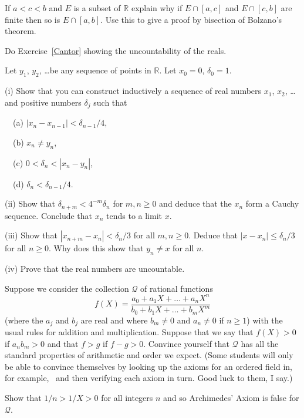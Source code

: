 \begin{question}
If $a<c<b$ and $E$ is a subset of ${\mathbb R}$
explain why if $E\cap [a,c]$ and $E\cap [c,b]$ are finite
then so is $E\cap [a,b]$. Use this to give a proof by bisection
of Bolzano's theorem.

\end{question}
\begin{question}
Do Exercise~\ref{Cantor}
showing the uncountability of the reals.

Let $y_{1}$, $y_{2}$, \dots be any
sequence of points in ${\mathbb R}$. Let $x_{0}=0$,
$\delta_{0}=1$.

(i) Show that you can construct inductively
a sequence of real numbers $x_{1}$, $x_{2}$, \dots
and positive numbers $\delta_{j}$ such that

\ \ (a) $|x_{n}-x_{n-1}|<\delta_{n-1}/4$,

\ \ (b) $x_{n}\neq y_{n}$,

\ \ (c) $0<\delta_{n}<|x_{n}-y_{n}|$,

\ \ (d) $\delta_{n}<\delta_{n-1}/4$.

(ii) Show that $\delta_{n+m}<4^{-m}\delta_{n}$ for $m,n\geq 0$
and deduce that the $x_{n}$ form a Cauchy sequence.
Conclude that $x_{n}$ tends to a limit $x$.

(iii) Show that $|x_{n+m}-x_{n}|<\delta_{n}/3$ for all 
$m,n\geq 0$. Deduce that $|x-x_{n}|\leq \delta_{n}/3$
for all $n\geq 0$. Why does this show that $y_{n}\neq x$
for all $n$.

(iv) Prove that the real numbers are uncountable.

\end{question}
\begin{question}
Suppose we consider the collection $\mathcal Q$
of rational functions
\[f(X)=\frac{a_{0}+a_{1}X+\dots+a_{n}X^{n}}
{b_{0}+b_{1}X+\dots+b_{m}X^{m}}\]
(where the $a_{j}$ and $b_{j}$ are real
and where $b_{m}\neq 0$ and $a_{n}\neq 0$ if $n\geq 1$)
with the usual rules for addition and multiplication.
Suppose that we say that $f(X)>0$ if
$a_{n}b_{m}>0$ and that $f>g$ if $f-g>0$.
Convince yourself that  $\mathcal Q$
has all the standard properties of arithmetic
and order we expect. (Some students will only be able
to convince themselves by looking up the axioms for
an ordered field in, for example,~\cite{Spivak}
and then verifying each axiom in turn. Good luck
to them, I say.)

Show that $1/n>1/X>0$ for all integers $n$ and
so Archimedes' Axiom is false for $\mathcal Q$.
\end{question}

